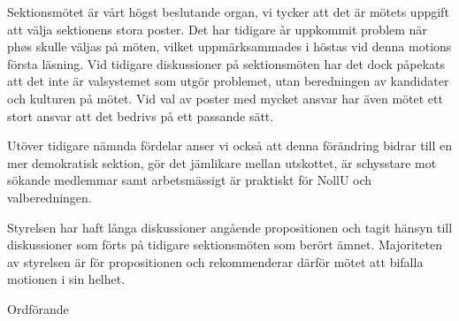 \documentclass[../_main/handlingar.tex]{subfiles}
\begin{document}
\motionssvar

Sektionsmötet är vårt högst beslutande organ, vi tycker att det är mötets uppgift att välja sektionens stora poster. Det har tidigare år uppkommit problem när phøs skulle väljas på möten, vilket uppmärksammades i höstas vid denna motions första läsning. Vid tidigare diskussioner på sektionsmöten har det dock påpekats att det inte är valsystemet som utgör problemet, utan beredningen av kandidater och kulturen på mötet. Vid val av poster med mycket ansvar har även mötet ett stort ansvar att det bedrivs på ett passande sätt. 

Utöver tidigare nämnda fördelar anser vi också att denna förändring bidrar till en mer demokratisk sektion, gör det jämlikare mellan utskottet, är schysstare mot sökande medlemmar samt arbetsmässigt är praktiskt för NollU och valberedningen. 

Styrelsen har haft långa diskussioner angående propositionen och tagit hänsyn till diskussioner som förts på tidigare sektionsmöten som berört ämnet. Majoriteten av styrelsen är för propositionen och rekommenderar därför mötet att bifalla motionen i sin helhet.

\begin{signatures}{1}
    \ist
    \signature{\ordf}{Ordförande}
\end{signatures}
\end{document}
